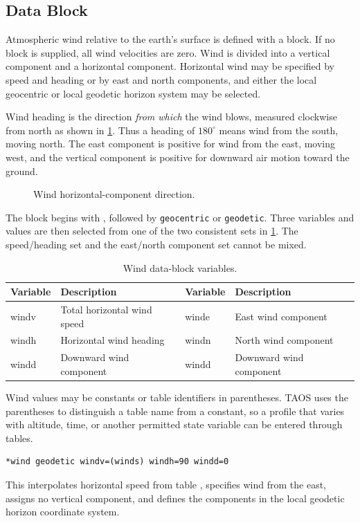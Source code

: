 \subsection{ Data Block}\label{sec:block-wind}

Atmospheric wind relative to the earth's surface is defined with a
 block. If no block is supplied, all wind velocities are zero.
Wind is divided into a vertical component and a horizontal component. Horizontal
wind may be specified by speed and heading or by east and north components, and
either the local geocentric or local geodetic horizon system may be selected.

Wind heading is the direction \emph{from which} the wind blows, measured
clockwise from north as shown in \cref{fig:wind-heading-direction}. Thus a heading
of $180^\circ$ means wind from the south, moving north. The east component is
positive for wind from the east, moving west, and the vertical component is positive
for downward air motion toward the ground.

\begin{figure}[htbp]
  \centering
  
  \caption{Wind horizontal-component direction.}
  \label{fig:wind-heading-direction}
\end{figure}

The block begins with , followed by \texttt{geocentric} or
\texttt{geodetic}. Three variables and values are then selected from one of the two
consistent sets in \cref{tab:wind-data-block-variables}. The speed/heading set and
the east/north component set cannot be mixed.

\begin{table}[htbp]
  \centering
  \caption{Wind data-block variables.}
  \label{tab:wind-data-block-variables}
  \begin{tabularx}{0.94\linewidth}{@{}>{\ttfamily}lX>{\ttfamily}lX@{}}
    \toprule
    \normalfont Variable & Description & \normalfont Variable & Description \\
    \midrule
    windv & Total horizontal wind speed & winde & East wind component \\
    windh & Horizontal wind heading & windn & North wind component \\
    windd & Downward wind component & windd & Downward wind component \\
    \bottomrule
  \end{tabularx}
\end{table}

Wind values may be constants or table identifiers in parentheses. TAOS uses the
parentheses to distinguish a table name from a constant, so a profile that varies with
altitude, time, or another permitted state variable can be entered through tables.

\begin{lstlisting}[style=taosmanual]
*wind geodetic windv=(winds) windh=90 windd=0
\end{lstlisting}

This interpolates horizontal speed from table , specifies wind from
the east, assigns no vertical component, and defines the components in the local
geodetic horizon coordinate system.
